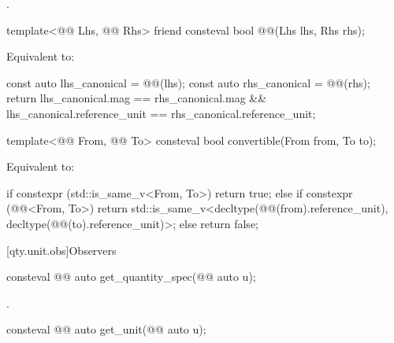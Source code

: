 \begin{itemdescr}
\pnum
\returns
{}.
\end{itemdescr}

\begin{itemdecl}
template<@@ Lhs, @@ Rhs>
friend consteval bool @@(Lhs lhs, Rhs rhs);
\end{itemdecl}

\begin{itemdescr}
\pnum
\effects
Equivalent to:
\begin{codeblock}
const auto lhs_canonical = @@(lhs);
const auto rhs_canonical = @@(rhs);
return lhs_canonical.mag == rhs_canonical.mag &&
       lhs_canonical.reference_unit == rhs_canonical.reference_unit;
\end{codeblock}
\end{itemdescr}

\begin{itemdecl}
template<@@ From, @@ To>
consteval bool convertible(From from, To to);
\end{itemdecl}

\begin{itemdescr}
\pnum
\effects
Equivalent to:
\begin{codeblock}
if constexpr (std::is_same_v<From, To>)
  return true;
else if constexpr (@@<From, To>)
  return std::is_same_v<decltype(@@(from).reference_unit),
                        decltype(@@(to).reference_unit)>;
else
  return false;
\end{codeblock}
\end{itemdescr}

[qty.unit.obs]{Observers}

\begin{itemdecl}
consteval @@ auto get_quantity_spec(@@ auto u);
\end{itemdecl}

\begin{itemdescr}
\pnum
\returns
{}.
\end{itemdescr}

\begin{itemdecl}
consteval @@ auto get_unit(@@ auto u);
\end{itemdecl}

